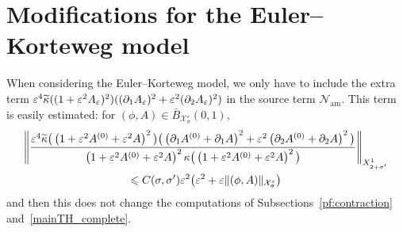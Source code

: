 \documentclass[10pt]{amsart}
\theoremstyle{definition}\newtheorem{defi}[theo]{Definition}\newtheorem{rema}[theo]{Remark}\newtheorem{exam}[theo]{Example}\newtheorem{exem}[theo]{Example}\newtheorem{nota}[theo]{Notation}
\newcommand*\p{\partial}
\newcommand{\amm}{\mathrm{am}}
\newcommand*\BN{\mathcal{N}}
\newcommand*\BX{\mathcal{X}}
\newcommand*\ls{\leqslant }
\newcommand*\e{\varepsilon}
\renewcommand*\t{\tilde}
\newcommand*\s{\sigma}
\let\oldtilde\tilde
\renewcommand*{\tilde}[1]{\mathchoice{\widetilde{#1}}{\widetilde{#1}}{\oldtilde{#1}}{\oldtilde{#1}}}
\begin{document}
\section{Modifications for the Euler--Korteweg model}

When considering the Euler--Korteweg model, we only have to include the extra term $ \e^4 \t\kappa ((1+ \e^2 A_\e)^2 ) ((\p_{1} A_\e)^2 + \e^2 (\p_{2} A_\e)^2) $ in the source term $ \BN_{\amm} $. This term is easily estimated: for $ (\phi, A) \in \bar{B}_{\BX^\e_{\s}} (0, 1) $,
\begin{multline*}
 \left\| \frac{\e^4 \t\kappa \big(\left(1+\e^2 A^{(0)} + \e^2 A\right)^2 \big)
\big(\left(\p_{1} A^{(0)} + \p_{1} A\right)^2 + \e^2 \left(\p_{2} A^{(0)} + \p_{2} A\right)^2 \big)}{\left(1+\e^2 A^{(0)} + \e^2 A\right)^2 \kappa \big(\left(1+\e^2 A^{(0)} + \e^2 A\right)^2 \big) }
\right\|_{X^1_{2+\s'}}
\\  \ls C (\s, \s') \e^2 \big(\e^2 + \e \| (\phi, A) \|_{\BX^\e_{\s}} \big)
\end{multline*}
and then this does not change the computations of Subsections~\ref{pf:contraction} and~\ref{mainTH_complete}.
\end{document}
